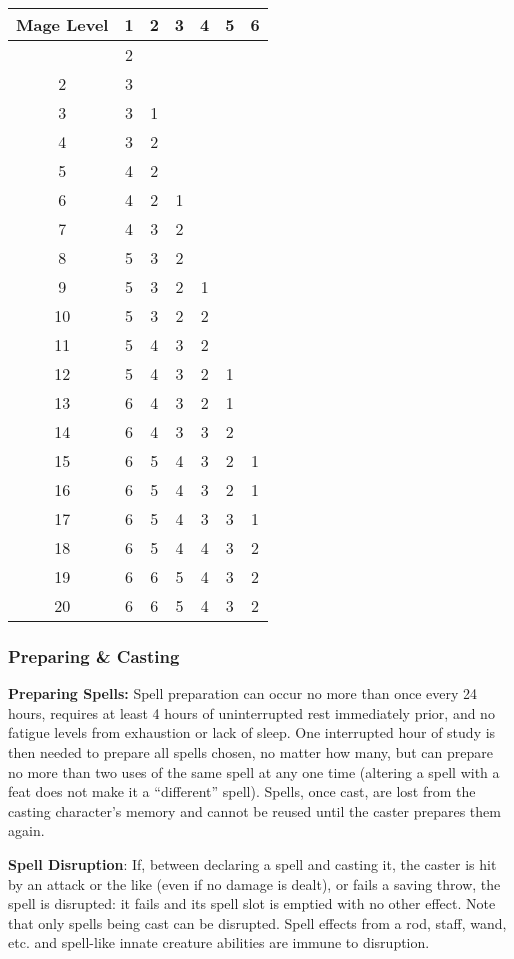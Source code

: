 \documentclass{article}
\begin{document}
\begin{multicols}{2}
\begin{longtable}[]{@{}ccccccc@{}}
\toprule\noalign{}
Mage Level & 1 & 2 & 3 & 4 & 5 & 6 \\
\midrule\noalign{}
\endhead
\bottomrule\noalign{}
\endlastfoot
1 & 2 & & & & & \\
2 & 3 & & & & & \\
3 & 3 & 1 & & & & \\
4 & 3 & 2 & & & & \\
5 & 4 & 2 & & & & \\
6 & 4 & 2 & 1 & & & \\
7 & 4 & 3 & 2 & & & \\
8 & 5 & 3 & 2 & & & \\
9 & 5 & 3 & 2 & 1 & & \\
10 & 5 & 3 & 2 & 2 & & \\
11 & 5 & 4 & 3 & 2 & & \\
12 & 5 & 4 & 3 & 2 & 1 & \\
13 & 6 & 4 & 3 & 2 & 1 & \\
14 & 6 & 4 & 3 & 3 & 2 & \\
15 & 6 & 5 & 4 & 3 & 2 & 1 \\
16 & 6 & 5 & 4 & 3 & 2 & 1 \\
17 & 6 & 5 & 4 & 3 & 3 & 1 \\
18 & 6 & 5 & 4 & 4 & 3 & 2 \\
19 & 6 & 6 & 5 & 4 & 3 & 2 \\
20 & 6 & 6 & 5 & 4 & 3 & 2 \\
\end{longtable}

\subsubsection{Preparing \& Casting}\label{preparing-casting}

\textbf{Preparing Spells:} Spell preparation can occur no more than once
every 24 hours, requires at least 4 hours of uninterrupted rest
immediately prior, and no fatigue levels from exhaustion or lack of
sleep. One interrupted hour of study is then needed to prepare all
spells chosen, no matter how many, but can prepare no more than two uses
of the same spell at any one time (altering a spell with a feat does not
make it a ``different'' spell). Spells, once cast, are lost from the
casting character's memory and cannot be reused until the caster
prepares them again.

\textbf{Spell Disruption}: If, between declaring a spell and casting it,
the caster is hit by an attack or the like (even if no damage is dealt),
or fails a saving throw, the spell is disrupted: it fails and its spell
slot is emptied with no other effect. Note that only spells being cast
can be disrupted. Spell effects from a rod, staff, wand, etc. and
spell-like innate creature abilities are immune to disruption.


\end{multicols}
\end{document}
